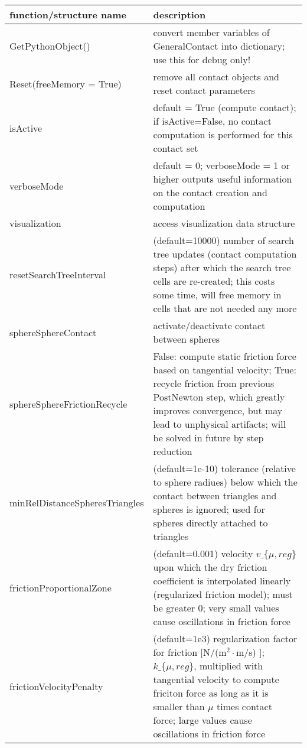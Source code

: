 \begin{center}
\footnotesize
\begin{longtable}{| p{8cm} | p{8cm} |} 
\hline
{\bf function/structure name} & {\bf description}\\ \hline
  GetPythonObject() & convert member variables of GeneralContact into dictionary; use this for debug only!\\ \hline 
  Reset(freeMemory = True) & remove all contact objects and reset contact parameters\\ \hline 
  isActive & default = True (compute contact); if isActive=False, no contact computation is performed for this contact set \\ \hline  
  verboseMode & default = 0; verboseMode = 1 or higher outputs useful information on the contact creation and computation \\ \hline  
  visualization & access visualization data structure \\ \hline  
  resetSearchTreeInterval & (default=10000) number of search tree updates (contact computation steps) after which the search tree cells are re-created; this costs some time, will free memory in cells that are not needed any more \\ \hline  
  sphereSphereContact & activate/deactivate contact between spheres \\ \hline  
  sphereSphereFrictionRecycle & False: compute static friction force based on tangential velocity; True: recycle friction from previous PostNewton step, which greatly improves convergence, but may lead to unphysical artifacts; will be solved in future by step reduction \\ \hline  
  minRelDistanceSpheresTriangles & (default=1e-10) tolerance (relative to sphere radiues) below which the contact between triangles and spheres is ignored; used for spheres directly attached to triangles \\ \hline  
  frictionProportionalZone & (default=0.001) velocity $v\_\{\mu,reg\}$ upon which the dry friction coefficient is interpolated linearly (regularized friction model); must be greater 0; very small values cause oscillations in friction force \\ \hline  
  frictionVelocityPenalty & (default=1e3) regularization factor for friction [N/(m$^2 \cdot$m/s) ];$k\_\{\mu,reg\}$, multiplied with tangential velocity to compute friciton force as long as it is smaller than $\mu$ times contact force; large values cause oscillations in friction force \\ \hline  

\end{longtable}
\end{center}
